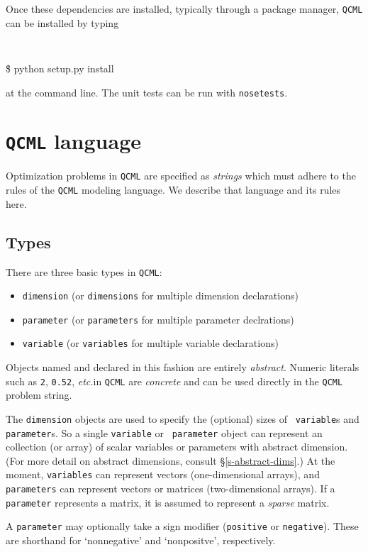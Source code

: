 \documentclass[11pt]{article}
\def\qcml{\texttt{QCML}\xspace}
\newcommand{\etc}{{\it etc.}}
\begin{document}
Once these dependencies are installed, typically through a package manager,
\qcml can be installed by typing
{\tt
\begin{tabbing}
  \qquad \= \$ python setup.py install
\end{tabbing}
}
\noindent at the command line. The unit tests can be run with {\tt nosetests}.

\section{\qcml language}
Optimization problems in \qcml are specified as \emph{strings} which must adhere to 
the rules of the \qcml modeling language. We describe that language and its
rules here.

\subsection{Types}
There are three basic types in \qcml:
\begin{itemize}
\item {\tt dimension} (or {\tt dimensions} for multiple dimension declarations)
\item {\tt parameter} (or {\tt parameters} for multiple parameter declrations)
\item {\tt variable} (or {\tt variables} for multiple variable declarations)
\end{itemize}
Objects named and declared in this fashion are entirely \emph{abstract}.
Numeric literals such as {\tt 2}, {\tt 0.52}, \etc in \qcml are
\emph{concrete} and can be used directly in the \qcml problem string. 

The {\tt dimension} objects are used to specify the (optional) sizes of {\tt
variable}s and {\tt parameter}s. So a single {\tt variable} or {\tt
parameter} object can represent an collection (or array) of scalar variables
or parameters with abstract dimension. (For more detail on abstract
dimensions, consult \S\ref{s-abstract-dims}.) At the moment, {\tt variables}
can represent vectors (one-dimensional arrays), and {\tt parameters} can
represent vectors or matrices (two-dimensional arrays). If a {\tt parameter}
represents a matrix, it is assumed to represent a \emph{sparse} matrix.

A {\tt parameter} may optionally take a sign modifier ({\tt positive} or 
{\tt negative}). These are shorthand for `nonnegative' and `nonpositve', 
respectively.
\end{document}
